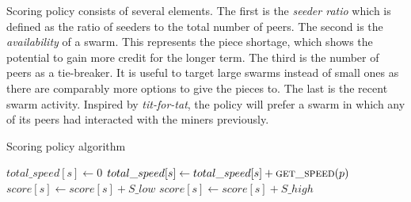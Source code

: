 Scoring policy consists of several elements. The first is the \textit{seeder ratio} which is defined as the ratio of seeders to the total number of peers. The second is the \textit{availability} of a swarm. This represents the piece shortage, which shows the potential to gain more credit for the longer term. The third is the number of peers as a tie-breaker. It is useful to target large swarms instead of small ones as there are comparably more options to give the pieces to. The last is the recent swarm  activity. Inspired by \textit{tit-for-tat}, the policy will prefer a swarm in which any of its peers had interacted with the miners previously.


\begin{algorithm}[h]
	\caption{Scoring policy algorithm}
	\label{alg:scorep}
	\begin{algorithmic}[1]
		\Statex
		\Statex
						\State $total\_speed[s] \gets 0$
				\State $total\_speed[s] \gets total\_speed[s] + \Call{get\_speed}{p}$
			\EndFor
		\EndFor
		\State {}
				\State $score[s] \gets score[s] + S\_low$
			\Else{\null}
				\State $score[s] \gets score[s] + S\_high$
			\EndIf
		\EndFor
		\State {}
	\end{algorithmic}
\end{algorithm}

